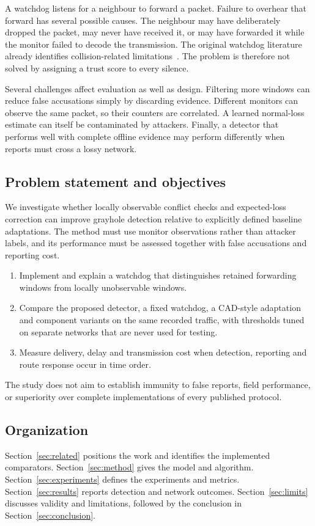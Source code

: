\documentclass{article}
\begin{document}
A watchdog listens for a neighbour to forward a packet. Failure to overhear that forward has several possible causes. The neighbour may have deliberately dropped the packet, may never have received it, or may have forwarded it while the monitor failed to decode the transmission. The original watchdog literature already identifies collision-related limitations~\cite{marti}. The problem is therefore not solved by assigning a trust score to every silence.

Several challenges affect evaluation as well as design. Filtering more windows can reduce false accusations simply by discarding evidence. Different monitors can observe the same packet, so their counters are correlated. A learned normal-loss estimate can itself be contaminated by attackers. Finally, a detector that performs well with complete offline evidence may perform differently when reports must cross a lossy network.

\subsection{Problem statement and objectives}
We investigate whether locally observable conflict checks and expected-loss correction can improve grayhole detection relative to explicitly defined baseline adaptations. The method must use monitor observations rather than attacker labels, and its performance must be assessed together with false accusations and reporting cost.
\begin{enumerate}
\item Implement and explain a watchdog that distinguishes retained forwarding windows from locally unobservable windows.
\item Compare the proposed detector, a fixed watchdog, a CAD-style adaptation and component variants on the same recorded traffic, with thresholds tuned on separate networks that are never used for testing.
\item Measure delivery, delay and transmission cost when detection, reporting and route response occur in time order.
\end{enumerate}
The study does not aim to establish immunity to false reports, field performance, or superiority over complete implementations of every published protocol.

\subsection{Organization}
Section~\ref{sec:related} positions the work and identifies the implemented comparators. Section~\ref{sec:method} gives the model and algorithm. Section~\ref{sec:experiments} defines the experiments and metrics. Section~\ref{sec:results} reports detection and network outcomes. Section~\ref{sec:limits} discusses validity and limitations, followed by the conclusion in Section~\ref{sec:conclusion}.
\end{document}
